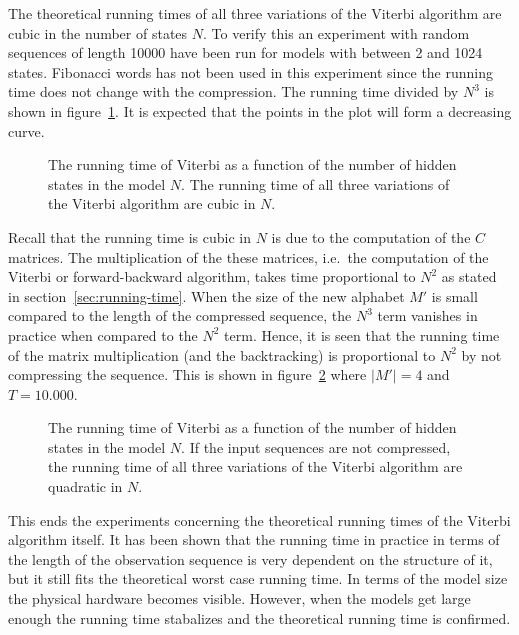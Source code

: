 The theoretical running times of all three variations of the Viterbi algorithm
are cubic in the number of states $N$. To verify this an experiment with random
sequences of length 10000 have been run for models with between 2 and 1024
states. Fibonacci words has not been used in this experiment since the running
time does not change with the compression. The running time divided by $N^3$ is
shown in figure~\ref{fig:assymptotic_viterbi_backtrack_N}. It is expected that
the points in the plot will form a decreasing curve. 

\begin{figure}
  \centering
  
  \caption{The running time of Viterbi as a function of the number of hidden
    states in the model $N$. The running time of all three variations of the Viterbi
    algorithm are cubic in $N$.}
  \label{fig:assymptotic_viterbi_backtrack_N}
\end{figure}

Recall that the running time is cubic in $N$ is due to the computation of the
$C$ matrices. The multiplication of the these matrices, i.e.\ the computation
of the Viterbi or forward-backward algorithm, takes time
proportional to $N^2$ as stated in section~\ref{sec:running-time}. When the
size of the new alphabet $M'$ is small compared to the length of the compressed
sequence, the $N^3$ term vanishes in practice when compared to the $N^2$
term. Hence, it is seen that the running time of the matrix multiplication
(and the backtracking) is proportional to $N^2$ by not compressing the
sequence. This is shown in figure~\ref{fig:assymptotic_viterbi_N} where
$\lvert M' \rvert = 4$ and $T = 10.000$.

\begin{figure}
  \centering
  
  \caption{The running time of Viterbi as a function of the number of hidden
    states in the model $N$. If the input sequences are not compressed, the
    running time of all three variations of the Viterbi algorithm are quadratic
    in $N$.}
  \label{fig:assymptotic_viterbi_N}
\end{figure}

This ends the experiments concerning the theoretical running times of the
Viterbi algorithm itself. It has been shown that the running time in practice
in terms of the length of the observation sequence is very dependent on the
structure of it, but it still fits the theoretical worst case running time. In
terms of the model size the physical hardware becomes visible. However, when
the models get large enough the running time stabalizes and the theoretical
running time is confirmed. 

